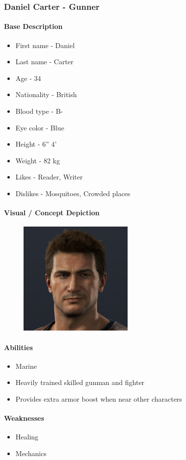 \subsubsection{\Large Daniel Carter - Gunner}
	\paragraph{\Large Base Description}\mbox{}
		\begin{itemize}
			\item First name - Daniel
			\item Last name - Carter
			\item Age - 34
			\item Nationality - British
			\item Blood type - B-
			\item Eye color - Blue
			\item Height - 6” 4’
			\item Weight - 82 kg
			\item Likes - Reader, Writer
			\item Dislikes - Mosquitoes, Crowded places
		\end{itemize}
	\paragraph{\Large Visual / Concept Depiction}\mbox{}
		\begin{figure}[H]
			\centering
			\includegraphics[width=0.5\textwidth]{images/characters/carter}
		\end{figure}
	\paragraph{\Large Abilities}\mbox{}
		\begin{itemize}
			\item Marine
			\item Heavily trained skilled gunman and fighter
			\item Provides extra armor boost when near other characters
		\end{itemize}
	\paragraph{\Large Weaknesses}\mbox{}
		\begin{itemize}
			\item Healing
			\item Mechanics
		\end{itemize}